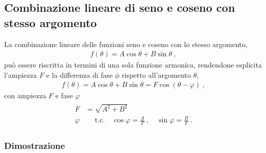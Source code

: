\documentclass[letterpaper,10pt,italian]{jupyterBook}
\begin{document}
\subsection{Combinazione lineare di seno e coseno con stesso argomento}
\label{\detokenize{ch/trigonometry:combinazione-lineare-di-seno-e-coseno-con-stesso-argomento}}\label{\detokenize{ch/trigonometry:math-hs-trigonometry-linear-combination}}
\sphinxAtStartPar
La combinazione lineare delle funzioni seno e coseno con lo stesso argomento,
\begin{equation*}
\begin{split}f(\theta) = A \cos \theta + B \sin \theta \ ,\end{split}
\end{equation*}
\sphinxAtStartPar
può essere riscritta in termini di una sola funzione armonica, rendendone esplicita l’ampiezza \(F\) e la differenza di fase \(\phi\) rispetto all’argomento \(\theta\),
\begin{equation*}
\begin{split}f(\theta) = A \cos \theta + B \sin \theta = F \cos( \theta - \varphi ) \ ,\end{split}
\end{equation*}
\sphinxAtStartPar
con ampiezza \(F\) e fase \(\varphi\)
\begin{equation*}
\begin{split}\begin{aligned}
  F & = \sqrt{A^2 + B^2} \\
  \varphi & \quad \text{ t.c.} \quad \cos \varphi = \frac{A}{F}  \ , \quad \sin \varphi = \frac{B}{F} \ . 
\end{aligned}\end{split}
\end{equation*}\subsubsection*{Dimostrazione}
\end{document}
